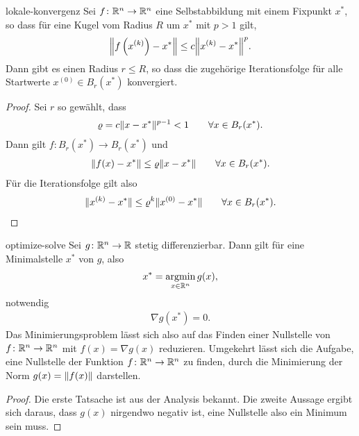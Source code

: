 \begin{Satz}{lokale-konvergenz}
  Sei $f\colon \mathbb R^n\to \mathbb R^n$ eine Selbstabbildung mit einem Fixpunkt
  $x^*$, so dass für eine Kugel vom Radius $R$ um $x^*$ mit $p>1$ gilt,
  \begin{gather}
    \norm*{f\left(x^{(k)}\right) - x^*}
    \le c \norm*{x^{(k)}-x^*}^p.
  \end{gather}
  Dann gibt es einen Radius $r\le R$, so dass die zugehörige
  Iterationsfolge für alle Startwerte $x^{(0)}\in B_r(x^*)$
  konvergiert.
\end{Satz}

\begin{proof}
  Sei $r$ so gewählt, dass
  \begin{gather}
    \varrho = c \lVert x-x^*\rVert^{p-1} < 1 \qquad\forall x\in B_r(x^*).
  \end{gather}
  Dann gilt $f\colon  B_r(x^*) \to  B_r(x^*)$ und
  \begin{gather}
    \lVert f(x)-x^*\rVert \le \varrho \lVert x-x^*\rVert \qquad\forall x\in B_r(x^*).
  \end{gather}
  Für die Iterationsfolge gilt also
  \begin{gather}
    \lVert x^{(k)}-x^*\rVert
    \le \varrho^k \lVert x^{(0)}-x^*\rVert
    \qquad\forall x\in B_r(x^*).
  \end{gather} 
\end{proof}

\begin{Satz}{optimize-solve}
  Sei $g\colon \mathbb R^n\to \mathbb R$ stetig differenzierbar. Dann gilt für eine
  Minimalstelle $x^*$ von $g$, also
  \begin{gather}
    x^* = \operatorname*{argmin}_{x\in\mathbb R^n} g(x),
  \end{gather}
  notwendig
  \begin{gather}
    \nabla g(x^*) = 0.
  \end{gather}
  Das Minimierungsproblem lässt sich also auf das Finden einer
  Nullstelle von $f\colon \mathbb R^n\to \mathbb R^n$ mit $f(x) = \nabla g(x)$
  reduzieren. Umgekehrt lässt sich die Aufgabe, eine Nullstelle der
  Funktion $f\colon \mathbb R^n \to \mathbb R^n$ zu finden, durch die Minimierung
  der Norm $g(x) = \lVert f(x)\rVert$ darstellen.
\end{Satz}

\begin{proof}
  Die erste Tatsache ist aus der Analysis bekannt. Die zweite Aussage
  ergibt sich daraus, dass $g(x)$ nirgendwo negativ ist, eine
  Nullstelle also ein Minimum sein muss.
\end{proof}


